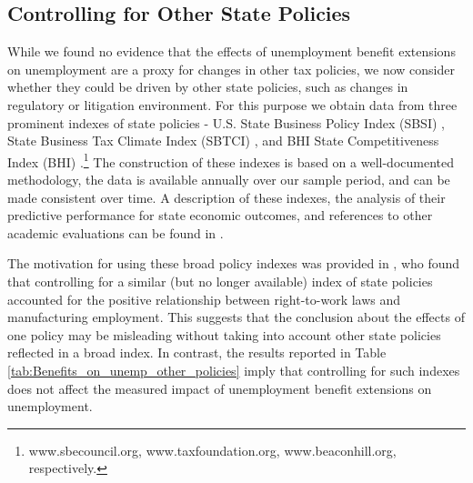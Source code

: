 \documentclass[12pt]{article}
\newcommand{\1}{\mathbf{1}}
\begin{document}
\begin{appendix}
\subsection{Controlling for Other State Policies}


While we found no evidence that the effects of unemployment benefit extensions on unemployment are a proxy for changes in other tax policies, we now consider whether they could be driven by other state policies, such as changes in regulatory or litigation environment. For this purpose we obtain data from three prominent indexes of state policies - U.S. State Business Policy Index (SBSI) \citep{data:sbec-sbsi}, State Business Tax Climate Index (SBTCI) \citep{data:tf-sbtc}, and BHI State Competitiveness Index (BHI) \citep{data:bhi-competitiveness}.\footnote{www.sbecouncil.org, www.taxfoundation.org, www.beaconhill.org, respectively.}  The construction of these indexes is based on a well-documented methodology, the data is available annually over our sample period, and can be made consistent over time. A description of these indexes, the analysis of their predictive performance for state economic outcomes, and references to other academic evaluations can be found in \citet{kolko+neumark+mejia:13}.


\begin{table}[t]
\centering
   \caption{Controlling for Other State Policies}\label{tab:Benefits_on_unemp_other_policies}
\small

\vspace{-0.2cm}
\end{table}


%

The motivation for using these broad policy indexes was provided in \citet{holmes:98}, who found that controlling for a similar (but no longer available) index of state policies accounted for the positive relationship between right-to-work laws and manufacturing employment. This suggests that the conclusion about the effects of one policy may be misleading without taking into account other state policies reflected in a broad index. In contrast, the results reported in Table \ref{tab:Benefits_on_unemp_other_policies} imply that controlling for such indexes does not affect the measured impact of unemployment benefit extensions on unemployment.




\end{appendix}
\end{document}
